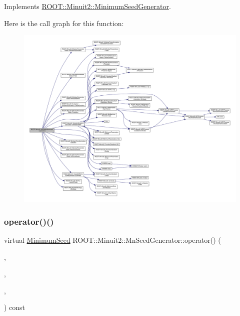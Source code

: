 Implements \mbox{\hyperlink{classROOT_1_1Minuit2_1_1MinimumSeedGenerator_a670b9671c73d7e0d3caa148e82d4b2fa}{R\+O\+O\+T\+::\+Minuit2\+::\+Minimum\+Seed\+Generator}}.

Here is the call graph for this function\+:
\nopagebreak
\begin{figure}[H]
\begin{center}
\leavevmode
\includegraphics[width=350pt]{de/da5/classROOT_1_1Minuit2_1_1MnSeedGenerator_a300ecb8a37b30fc5bd13c353f3338a92_cgraph}
\end{center}
\end{figure}
\mbox{\label{classROOT_1_1Minuit2_1_1MnSeedGenerator_aeba9e3b985e5d74e797cafaffec74de3}} 
\subsubsection{\texorpdfstring{operator()()}{operator()()}\hspace{0.1cm}{\footnotesize\ttfamily [6/6]}}
{\footnotesize\ttfamily virtual \mbox{\hyperlink{classROOT_1_1Minuit2_1_1MinimumSeed}{Minimum\+Seed}} R\+O\+O\+T\+::\+Minuit2\+::\+Mn\+Seed\+Generator\+::operator() (\begin{DoxyParamCaption}\item[{const \mbox{\hyperlink{classROOT_1_1Minuit2_1_1MnFcn}{Mn\+Fcn}} \&}]{,  }\item[{const \mbox{\hyperlink{classROOT_1_1Minuit2_1_1AnalyticalGradientCalculator}{Analytical\+Gradient\+Calculator}} \&}]{,  }\item[{const \mbox{\hyperlink{classROOT_1_1Minuit2_1_1MnUserParameterState}{Mn\+User\+Parameter\+State}} \&}]{,  }\item[{const \mbox{\hyperlink{classROOT_1_1Minuit2_1_1MnStrategy}{Mn\+Strategy}} \&}]{ }\end{DoxyParamCaption}) const\hspace{0.3cm}{\ttfamily [virtual]}}




